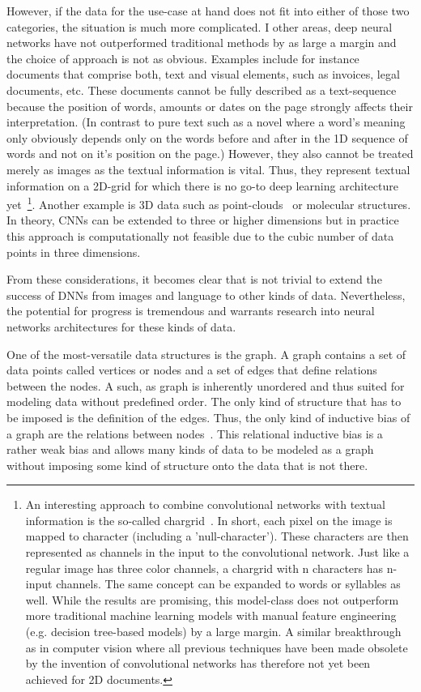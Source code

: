 However, if the data for the use-case at hand does not fit into either of those two categories, the situation is much more complicated. I other areas, deep neural networks have not outperformed traditional methods by as large a margin and the choice of approach is not as obvious. Examples include for instance documents that comprise both, text and visual elements, such as invoices, legal documents, etc. These documents cannot be fully described as a text-sequence because the position of words, amounts or dates on the page strongly affects their interpretation. (In contrast to pure text such as a novel where a word's meaning only obviously depends only on the words before and after in the 1D sequence of words and not on it's position on the page.) However, they also cannot be treated merely as images as the textual information is vital. Thus, they represent textual information on a 2D-grid for which there is no go-to deep learning architecture yet~\footnote{An interesting approach to combine convolutional networks with textual information is the so-called chargrid~\cite{Katti2020}. In short, each pixel on the image is mapped to character (including a 'null-character'). These characters are then represented as channels in the input to the convolutional network. Just like a regular image has three color channels, a chargrid with n characters has n-input channels. The same concept can be expanded to words or syllables as well. While the results are promising, this model-class does not outperform more traditional machine learning models with manual feature engineering (e.g. decision tree-based models) by a large margin. A similar breakthrough as in computer vision where all previous techniques have been made obsolete by the invention of convolutional networks has therefore not yet been achieved for 2D documents.}. Another example is 3D data such as point-clouds~\cite{Charles2017} or molecular structures. In theory, CNNs can be extended to three or higher dimensions but in practice this approach is computationally not feasible due to the cubic number of data points in three dimensions.

From these considerations, it becomes clear that is not trivial to extend the success of DNNs from images and language to other kinds of data. Nevertheless, the potential for progress is tremendous and warrants research into neural networks architectures for these kinds of data.

One of the most-versatile data structures is the graph. A graph contains a set of data points called vertices or nodes and a set of edges that define relations between the nodes. A such, as graph is inherently unordered and thus suited for modeling data without predefined order. The only kind of structure that has to be imposed is the definition of the edges. Thus, the only kind of inductive bias of a graph are the relations between nodes~\cite{Battaglia2018}. This relational inductive bias is a rather weak bias and allows many kinds of data to be modeled as a graph without imposing some kind of structure onto the data that is not there.

